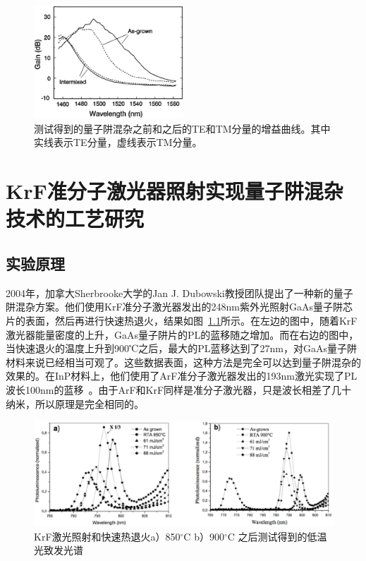 \documentclass{ZJUthesis}
\begin{document}
\begin{figure}[htbp]
    \centering
    \includegraphics[width=0.5\textwidth]{./Pictures/amplifier.eps}
    \caption{测试得到的量子阱混杂之前和之后的TE和TM分量的增益曲线。其中实线表示TE分量，虚线表示TM分量。}
    \label{fig_amplifier}
\end{figure}

\chapter{KrF准分子激光器照射实现量子阱混杂技术的工艺研究}

\section{实验原理}

2004年，加拿大Sherbrooke大学的Jan J. Dubowski教授团队提出了一种新的量子阱混杂方案\cite{Genest2004UV}。他们使用KrF准分子激光器发出的248nm紫外光照射GaAs量子阱芯片的表面，然后再进行快速热退火，结果如图~\ref{fig_sherbrooke}所示。在左边的图中，随着KrF激光器能量密度的上升，GaAs量子阱片的PL的蓝移随之增加。而在右边的图中，当快速退火的温度上升到900℃之后，最大的PL蓝移达到了27nm，对GaAs量子阱材料来说已经相当可观了。这些数据表面，这种方法是完全可以达到量子阱混杂的效果的。在InP材料上，他们使用了ArF准分子激光器发出的193nm激光实现了PL波长100nm的蓝移\cite{Genest2008ArF}~。由于ArF和KrF同样是准分子激光器，只是波长相差了几十纳米，所以原理是完全相同的。

\begin{figure}[htbp]
    \centering
    \includegraphics[width=1.0\textwidth]{./Pictures/sherbrooke.eps}
    \caption{KrF激光照射和快速热退火a）850$^{\circ}$C b）900$^{\circ}$C 之后测试得到的低温光致发光谱}
    \label{fig_sherbrooke}
\end{figure}
\end{document}
